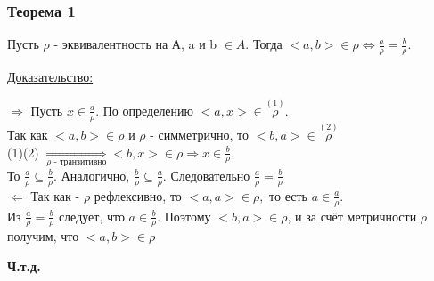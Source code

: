 \documentclass[12pt]{article}
\begin{document}
    \subsubsection*{Теорема 1}\label{th:1}
    \par\noindent
    Пусть $\rho$ - эквивалентность на А, a и b $\in A$. Тогда $<a,b> \in \rho \Leftrightarrow \frac{a}{\rho}=\frac{b}{\rho}.$\\
    \par\noindent
    \underline{Доказательство:}
    \begin{adjustwidth}{1.5em}{1.5em}
        $\boxed{\Rightarrow}$ Пусть $x \in \frac{a}{\rho}.$ По определению $<a,x> \in \overset{(1)}{\rho}$. \\
        Так как $<a,b>\in \rho$ и $\rho$ - симметрично, то $<b,a> \in \overset{(2)}{\rho}$\\
        (1)(2) $\underset{\rho \text{ - транзитивно}}{\Rightarrow} <b,x> \in \rho \Rightarrow x \in \frac{b}{\rho}$.\\
        То $\frac{a}{\rho} \subseteq \frac{b}{\rho}.$ Аналогично, $\frac{b}{\rho} \subseteq \frac{a}{\rho}$. 
        Следовательно $\frac{a}{\rho}=\frac{b}{\rho}$\\
        $\boxed{\Leftarrow}$ Так как - $\rho$ рефлексивно, то $<a,a> \in \rho,$ то есть $a \in \frac{a}{\rho}$.\\
        Из $\frac{a}{\rho}=\frac{b}{\rho}$ следует, что $a \in \frac{b}{\rho}.$ Поэтому $<b,a> \in \rho$, и за счёт
        метричности $\rho$ получим, что $<a,b> \in \rho$
    \end{adjustwidth}
    \begin{center}
        \textbf{Ч.т.д.}
    \end{center}
\end{document}
